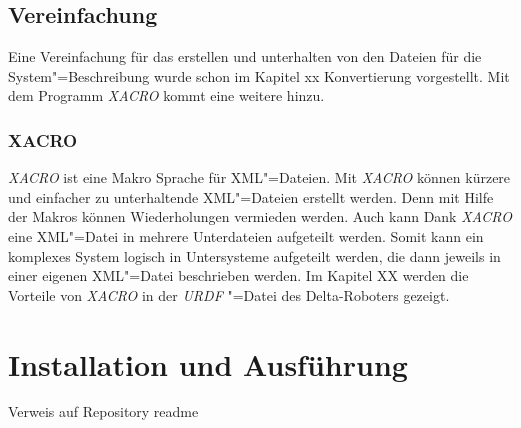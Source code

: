 \subsection{Vereinfachung}
Eine Vereinfachung für das erstellen und unterhalten von den Dateien für die System"=Beschreibung wurde schon im Kapitel xx Konvertierung vorgestellt. %
Mit dem Programm \textit{XACRO} kommt eine weitere hinzu. 

\subsubsection{XACRO} %
\label{chap:xacro}
\textit{XACRO} ist eine Makro Sprache für XML"=Dateien. %
Mit \textit{XACRO} können kürzere und einfacher zu unterhaltende XML"=Dateien erstellt werden.
Denn mit Hilfe der Makros können Wiederholungen vermieden werden.
Auch kann Dank \textit{XACRO} eine XML"=Datei in mehrere Unterdateien aufgeteilt werden.
Somit kann ein komplexes System logisch in Untersysteme aufgeteilt werden, die dann jeweils in einer eigenen XML"=Datei beschrieben werden. 
Im Kapitel XX werden die Vorteile von \textit{XACRO} in der \textit{URDF} "=Datei des Delta-Roboters gezeigt.


\section{Installation und Ausführung}
Verweis auf Repository readme